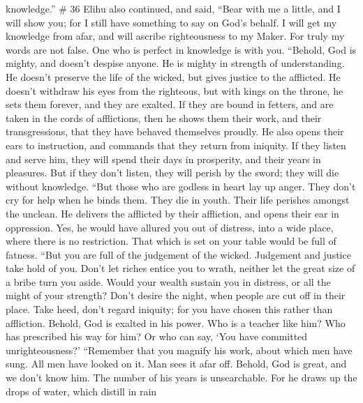 knowledge.'' \# 36  Elihu also continued, and said,
 ``Bear with me a little, and I will show you; for I still
have something to say on God's behalf.  I will get my
knowledge from afar, and will ascribe righteousness to my Maker.
 For truly my words are not false. One who is perfect in
knowledge is with you.  ``Behold, God is mighty, and doesn't
despise anyone. He is mighty in strength of understanding. 
He doesn't preserve the life of the wicked, but gives justice to the
afflicted.  He doesn't withdraw his eyes from the righteous,
but with kings on the throne, he sets them forever, and they are
exalted.  If they are bound in fetters, and are taken in the
cords of afflictions,  then he shows them their work, and
their transgressions, that they have behaved themselves proudly.
 He also opens their ears to instruction, and commands that
they return from iniquity.  If they listen and serve him,
they will spend their days in prosperity, and their years in pleasures.
 But if they don't listen, they will perish by the sword;
they will die without knowledge.  ``But those who are
godless in heart lay up anger. They don't cry for help when he binds
them.  They die in youth. Their life perishes amongst the
unclean.  He delivers the afflicted by their affliction,
and opens their ear in oppression.  Yes, he would have
allured you out of distress, into a wide place, where there is no
restriction. That which is set on your table would be full of fatness.
 ``But you are full of the judgement of the wicked.
Judgement and justice take hold of you.  Don't let riches
entice you to wrath, neither let the great size of a bribe turn you
aside.  Would your wealth sustain you in distress, or all
the might of your strength?  Don't desire the night, when
people are cut off in their place.  Take heed, don't regard
iniquity; for you have chosen this rather than affliction. 
Behold, God is exalted in his power. Who is a teacher like him?
 Who has prescribed his way for him? Or who can say, `You
have committed unrighteousness?'  ``Remember that you
magnify his work, about which men have sung.  All men have
looked on it. Man sees it afar off.  Behold, God is great,
and we don't know him. The number of his years is unsearchable.
 For he draws up the drops of water, which distill in rain
